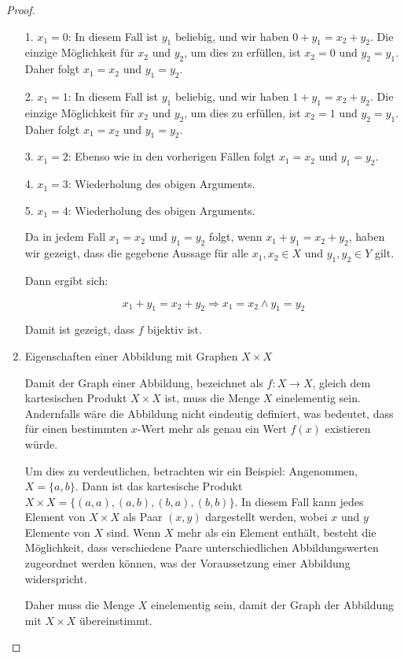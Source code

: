 \documentclass{../problemset}
\begin{document}
\begin{problem}[Graphen]
\begin{proof}
\begin{enumerate}
		      1. \(x_1 = 0\): In diesem Fall ist \(y_1\) beliebig, und wir haben \(0 + y_1 = x_2 + y_2\). Die einzige Möglichkeit für \(x_2\) und \(y_2\), um dies zu erfüllen, ist \(x_2 = 0\) und \(y_2 = y_1\). Daher folgt \(x_1 = x_2\) und \(y_1 = y_2\).

		      2. \(x_1 = 1\): In diesem Fall ist \(y_1\) beliebig, und wir haben \(1 + y_1 = x_2 + y_2\). Die einzige Möglichkeit für \(x_2\) und \(y_2\), um dies zu erfüllen, ist \(x_2 = 1\) und \(y_2 = y_1\). Daher folgt \(x_1 = x_2\) und \(y_1 = y_2\).

		      3. \(x_1 = 2\): Ebenso wie in den vorherigen Fällen folgt \(x_1 = x_2\) und \(y_1 = y_2\).

		      4. \(x_1 = 3\): Wiederholung des obigen Arguments.

		      5. \(x_1 = 4\): Wiederholung des obigen Arguments.

		      Da in jedem Fall \(x_1 = x_2\) und \(y_1 = y_2\) folgt, wenn \(x_1 + y_1 = x_2 + y_2\), haben wir gezeigt, dass die gegebene Aussage für alle \(x_1, x_2 \in X\) und \(y_1, y_2 \in Y\) gilt.

		      Dann ergibt sich:

		      \[
			      x_1 + y_1 = x_2 + y_2 \Rightarrow x_1 = x_2 \land y_1 = y_2
		      \]

		      Damit ist gezeigt, dass \(f\) bijektiv ist.

		\item Eigenschaften einer Abbildung mit Graphen $X \times X$

		      Damit der Graph einer Abbildung, bezeichnet als $f: X \rightarrow X$, gleich dem kartesischen Produkt $X \times X$ ist, muss die Menge $X$ einelementig sein.
		      Andernfalls wäre die Abbildung nicht eindeutig definiert, was bedeutet, dass für einen bestimmten $x$-Wert mehr als genau ein Wert $f(x)$ existieren würde.

		      Um dies zu verdeutlichen, betrachten wir ein Beispiel: Angenommen, $X = \{a, b\}$.
		      Dann ist das kartesische Produkt $X \times X = \{(a, a), (a, b), (b, a), (b, b)\}$. In diesem Fall kann jedes Element von $X \times X$ als Paar $(x, y)$ dargestellt werden, wobei $x$ und $y$ Elemente von $X$ sind. Wenn $X$ mehr als ein Element enthält, besteht die Möglichkeit, dass verschiedene Paare unterschiedlichen Abbildungswerten zugeordnet werden können, was der Voraussetzung einer Abbildung widerspricht.

		      Daher muss die Menge $X$ einelementig sein, damit der Graph der Abbildung mit $X \times X$ übereinstimmt.

	\end{enumerate}
\end{proof}

\end{problem}
\end{document}
